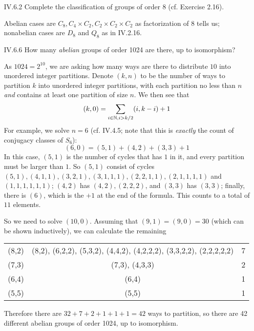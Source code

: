 \begin{problem}{IV.6.2}
Complete the classification of groups of order 8 (cf. Exercise 2.16).
\end{problem}
\begin{sol}
Abelian cases are $C_8, C_4 \times C_2, C_2 \times C_2 \times C_2$ as factorization of $8$ tells us; nonabelian cases are $D_8$ and $Q_8$ as in IV.2.16.
\end{sol}

\begin{problem}{IV.6.6}
How many \emph{abelian} groups of order 1024 are there, up to isomorphism?
\end{problem}
\begin{sol}
As $1024 = 2^{10}$, we are asking how many ways are there to distribute $10$ into unordered integer partitions. Denote $(k,n)$ to be the number of ways to partition $k$ into unordered integer partitions, with each partition no less than $n$ \emph{and} contains at least one partition of size $n$. We then see that 
\[
(k,0) = \sum_{i \in \mathbb{N}, i > k/2} (i,k-i) + 1
\]
For example, we solve $n=6$ (cf. IV.4.5; note that this is \emph{exactly} the count of conjugacy classes of $S_6$):
\[
(6,0) = (5,1)+(4,2)+(3,3)+1
\]
In this case, $(5,1)$ is the number of cycles that has $1$ in it, and every partition must be larger than $1$. So $(5,1)$ consist of cycles $(5,1),(4,1,1),(3,2,1),(3,1,1,1),(2,2,1,1),(2,1,1,1,1)$ and $(1,1,1,1,1,1)$; $(4,2)$ has $(4,2),(2,2,2)$, and $(3,3)$ has $(3,3)$; finally, there is $(6)$, which is the $+1$ at the end of the formula. This counts to a total of $11$ elements.

So we need to solve $(10,0)$. Assuming that $(9,1) = (9,0) = 30$ (which can be shown inductively), we can calculate the remaining
\begin{center}
\begin{tabular}{c|c|c}
(8,2) &(8,2), (6,2,2), (5,3,2), (4,4,2), (4,2,2,2), (3,3,2,2), (2,2,2,2,2) &7 \\
(7,3) &(7,3), (4,3,3) &2\\
(6,4) &(6,4) &1\\
(5,5) &(5,5) &1\\
\end{tabular}	
\end{center}
Therefore there are $32+7+2+1+1+1 = 42$ ways to partition, so there are 42 different abelian groups of order 1024, up to isomorphism.
\end{sol}